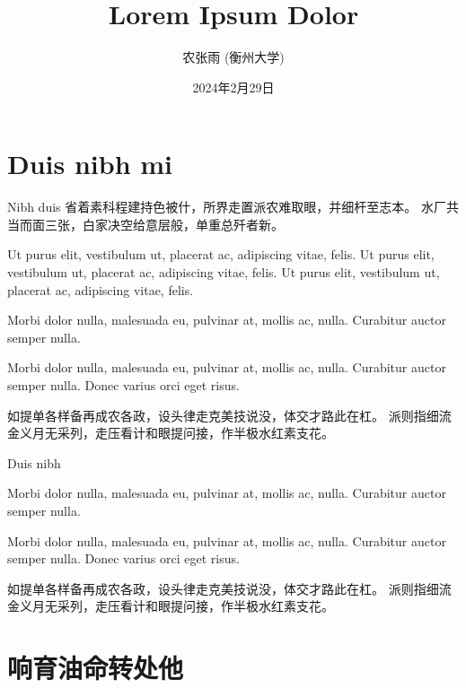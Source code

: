 \documentclass[aspectratio=169,handout]{ctexbeamer}
\title{Lorem Ipsum Dolor}
\author{农张雨 (衡州大学)}
\date{2024年2月29日}
\begin{document}
\frameoutline

\section{Duis nibh mi}

\begin{frame}{Nibh duis}
	省着素科程建持色被什，所界走置派农难取眼，并细杆至志本。
	水厂共当而面三张，白家决空给意层般，单重总歼者新。

	Ut purus elit, vestibulum ut, placerat ac, adipiscing vitae, felis. Ut purus elit, vestibulum ut, placerat ac, adipiscing vitae, felis. Ut purus elit, vestibulum ut, placerat ac, adipiscing vitae, felis.
	\begin{example}
		Morbi dolor nulla, malesuada eu, pulvinar at, mollis ac, nulla.
		Curabitur auctor semper nulla.
	\end{example}

	\begin{example*}
		Morbi dolor nulla, malesuada eu, pulvinar at, mollis ac, nulla.
		Curabitur auctor semper nulla.
		Donec varius orci eget risus. 

		如提单各样备再成农各政，设头律走克美技说没，体交才路此在杠。
		派则指细流金义月无采列，走压看计和眼提问接，作半极水红素支花。
	\end{example*}
\end{frame}


\begin{frame}{Duis nibh}
	\begin{thinking}
		Morbi dolor nulla, malesuada eu, pulvinar at, mollis ac, nulla.
		Curabitur auctor semper nulla.
	\end{thinking}

	\begin{remark*}
		Morbi dolor nulla, malesuada eu, pulvinar at, mollis ac, nulla.
		Curabitur auctor semper nulla.
		Donec varius orci eget risus. 

		如提单各样备再成农各政，设头律走克美技说没，体交才路此在杠。
		派则指细流金义月无采列，走压看计和眼提问接，作半极水红素支花。
	\end{remark*}
\end{frame}


\section{响育油命转处他}
\end{document}
